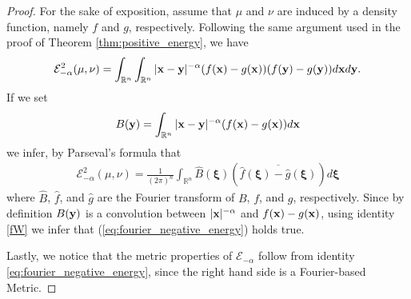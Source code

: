 \documentclass{article}
\newcommand{\fer}[1]{(\ref{#1})}
\def\bx{{\bf x}}
\def\by{{\bf y}}
\def\bxi{{\pmb\xi}}
\def \erre{\mathbb{R}}
\newtheorem{proof}{Proof}
\begin{document}
\begin{proof}
    For the sake of exposition, assume that $\mu$ and $\nu$ are induced by a density function, namely $f$ and $g$, respectively.
    Following the same argument used in the proof of Theorem \ref{thm:positive_energy}, we have
    \[
        \mathcal{E}^2_{-\alpha}(\mu,\nu)=\int_{\erre^n}\int_{\erre^n}|\bx-\by|^{-\alpha}(f(\bx)-g(\bx))(f(\by)-g(\by))d\bx d\by.
    \]
    If we set
    \[
    B(\by)=\int_{\erre^n}|\bx-\by|^{-\alpha}(f(\bx)-g(\bx))d\bx
    \]
    we infer, by Parseval's formula that
    \begin{align}
        \mathcal{E}^2_{-\alpha}(\mu,\nu)=\frac 1{(2\pi)^n}\int_{\erre^n}\hat B(\bxi)(\overline{\hat f(\bxi)- \hat g(\bxi)}) d\bxi
    \end{align}
    where $\hat B$, $\hat f$, and $\hat g$ are the Fourier transform of $B$, $f$, and $g$, respectively.
    Since by definition $B(\by)$ is a convolution between $|\bx|^{-\alpha}$ and $f(\bx)-g(\bx)$, using identity \eqref{fW} we infer that \fer{eq:fourier_negative_energy} holds true.
    
    Lastly, we notice that the metric properties of $\mathcal{E}_{-\alpha}$ follow from identity \eqref{eq:fourier_negative_energy}, since the right hand side is a Fourier-based Metric.
\end{proof}

%
\end{document}
